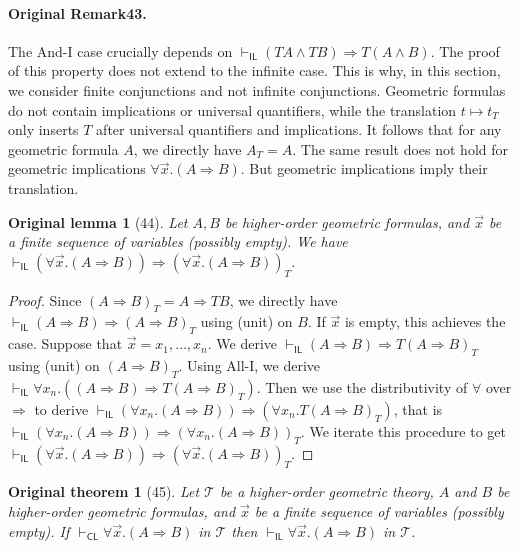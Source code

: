 \documentclass[10pt,a4paper]{article}
\newcommand{\IL}{\mathsf{IL}}
\newcommand{\CL}{\mathsf{CL}}
\newtheorem*{authorlemma}{Original lemma}
\newtheorem*{authortheorem}{Original theorem}
\begin{document}
\paragraph{Original Remark43.} The And-I case crucially depends on $\vdash_\IL(TA\wedge TB)\Rightarrow T(A\wedge B)$. The proof of this property does not extend to the infinite case. This is why, in this section, we consider finite conjunctions and not infinite conjunctions.
Geometric formulas do not contain implications or universal quantifiers, while the translation $t\mapsto t_T$ only inserts $T$ after universal quantifiers and implications. It follows that for any geometric formula $A$, we directly have $A_T=A$. The same result does not hold for geometric implications $\forall\vec x.(A\Rightarrow B)$. But geometric implications imply their translation.
\begin{authorlemma}[44]
Let $A,B$ be higher-order geometric formulas, and $\vec x$ be a finite sequence of variables (possibly empty). We have $\vdash_\IL(\forall\vec x.(A\Rightarrow B))\Rightarrow(\forall\vec x.(A\Rightarrow B))_T$.
\end{authorlemma}
\begin{proof}
Since $(A\Rightarrow B)_T=A\Rightarrow TB$, we directly have $\vdash_\IL(A\Rightarrow B)\Rightarrow(A\Rightarrow B)_T$ using (unit) on $B$. If $\vec x$ is empty, this achieves the case. Suppose that $\vec x=x_1,\ldots,x_n$. We derive $\vdash_\IL(A\Rightarrow B)\Rightarrow T(A\Rightarrow B)_T$ using (unit) on $(A\Rightarrow B)_T$. Using All-I, we derive $\vdash_\IL\forall x_n.((A\Rightarrow B)\Rightarrow T(A\Rightarrow B)_T)$. Then we use the distributivity of $\forall$ over $\Rightarrow$ to derive $\vdash_\IL(\forall x_n.(A\Rightarrow B))\Rightarrow(\forall x_n.T(A\Rightarrow B)_T)$, that is $\vdash_\IL(\forall x_n.(A\Rightarrow B))\Rightarrow(\forall x_n.(A\Rightarrow B))_T$. We iterate this procedure to get $\vdash_\IL(\forall\vec x.(A\Rightarrow B))\Rightarrow(\forall\vec x.(A\Rightarrow B))_T$.
\end{proof}

\begin{authortheorem}[45]
Let $\mathcal T$ be a higher-order geometric theory, $A$ and $B$ be higher-order geometric formulas, and $\vec x$ be a finite sequence of variables (possibly empty). If $\vdash_\CL\forall\vec x.(A\Rightarrow B)$ in $\mathcal T$ then $\vdash_\IL\forall\vec x.(A\Rightarrow B)$ in $\mathcal T$.
\end{authortheorem}
\end{document}
